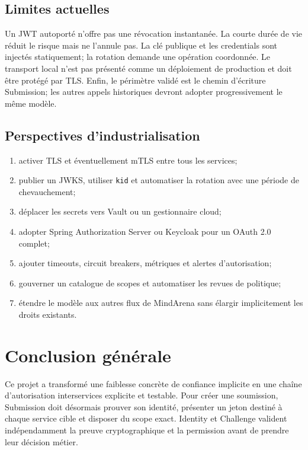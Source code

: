 \documentclass[12pt,a4paper,oneside]{report}
\newcommand{\code}[1]{\texttt{#1}}
\begin{document}
\section{Limites actuelles}
Un JWT autoporté n'offre pas une révocation instantanée. La courte durée de vie
réduit le risque mais ne l'annule pas. La clé publique et les credentials sont
injectés statiquement; la rotation demande une opération coordonnée. Le transport
local n'est pas présenté comme un déploiement de production et doit être protégé
par TLS. Enfin, le périmètre validé est le chemin d'écriture Submission; les
autres appels historiques devront adopter progressivement le même modèle.

\section{Perspectives d'industrialisation}
\begin{enumerate}
  \item activer TLS et éventuellement mTLS entre tous les services;
  \item publier un JWKS, utiliser \code{kid} et automatiser la rotation avec
    une période de chevauchement;
  \item déplacer les secrets vers Vault ou un gestionnaire cloud;
  \item adopter Spring Authorization Server ou Keycloak pour un OAuth 2.0 complet;
  \item ajouter timeouts, circuit breakers, métriques et alertes d'autorisation;
  \item gouverner un catalogue de scopes et automatiser les revues de politique;
  \item étendre le modèle aux autres flux de MindArena sans élargir
    implicitement les droits existants.
\end{enumerate}

\chapter*{Conclusion générale}
Ce projet a transformé une faiblesse concrète de confiance implicite en une
chaîne d'autorisation interservices explicite et testable. Pour créer une
soumission, Submission doit désormais prouver son identité, présenter un jeton
destiné à chaque service cible et disposer du scope exact. Identity et Challenge
valident indépendamment la preuve cryptographique et la permission avant de
prendre leur décision métier.
\end{document}
